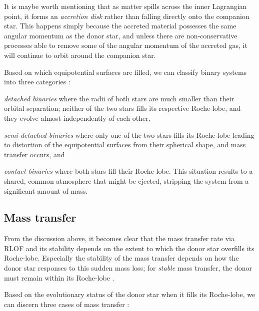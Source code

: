 \documentclass[../../main/thesis_msc.tex]{subfiles}
\begin{document}
				It is maybe worth mentioning that as matter spills across the inner Lagrangian point, it forms an \emph{accretion disk} rather than falling directly onto the companion star. This happens simply because the accreted material possesses the same angular momentum as the donor star, and unless there are non-conservative processes able to remove some of the angular momentum of the accreted gas, it will continue to orbit around the companion star.
				
				Based on which equipotential surfaces are filled, we can classify binary systems into three categories \citep[see also][]{Weigert1968}:
					\begin{enumerate*}[label=(\roman*)]
						\item \emph{detached binaries} where the radii of both stars are much smaller than their orbital separation; neither of the two stars fills its respective Roche-lobe, and they evolve almost independently of each other,
						\item \emph{semi-detached binaries} where only one of the two stars fills its Roche-lobe leading to distortion of the equipotential surfaces from their spherical shape, and mass transfer occurs, and
						\item \emph{contact binaries} where both stars fill their Roche-lobe. This situation results to a shared, common atmosphere that might be ejected, stripping the system from a significant amount of mass.
					\end{enumerate*}									
				

					
			\subsection{Mass transfer}
			
				From the discussion above, it becomes clear that the mass transfer rate via RLOF and its stability depends on the extent to which the donor star overfills its Roche-lobe. Especially the stability of the mass transfer depends on how the donor star responses to this sudden mass loss; for \emph{stable} mass transfer, the donor must remain within its Roche-lobe \citep[see][for discussion]{Ivanova2015, Postnov2014, Soberman1997, Kalogera1996}.
				
				Based on the evolutionary status of the donor star when it fills its Roche-lobe, we can discern three cases of mass transfer \citep{Kipp1967, Lauterborn1970}:
				
\end{document}
